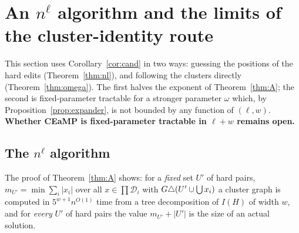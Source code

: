 \section{An \texorpdfstring{$n^{\ell}$}{n\^l} algorithm and the limits of the cluster-identity route}\label{sec:nl}\label{sec:dproute}
This section uses Corollary~\ref{cor:cand} in two ways: guessing the positions of the hard edits (Theorem~\ref{thm:nl}), and following the clusters directly (Theorem~\ref{thm:omega}). The first halves the exponent of Theorem~\ref{thm:A}; the second is fixed-parameter tractable for a stronger parameter $\omega$ which, by Proposition~\ref{prop:expander}, is not bounded by any function of $(\ell,w)$. \textbf{Whether CEaMP is fixed-parameter tractable in $\ell+w$ remains open.}

\subsection{The \texorpdfstring{$n^{\ell}$}{n\^l} algorithm}
\begin{remark}\label{rem:fixU}
The proof of Theorem~\ref{thm:A} shows: for a \emph{fixed} set $U'$ of hard pairs, $m_{U'}=\min\sum_i|x_i|$ over all $x\in\prod\mathcal D_i$ with $G\triangle(U'\cup\bigcup x_i)$ a cluster graph is computed in $5^{w+1}n^{O(1)}$ time from a tree decomposition of $I(H)$ of width $w$, and for \emph{every} $U'$ of hard pairs the value $m_{U'}+|U'|$ is the size of an actual solution.
\end{remark}

